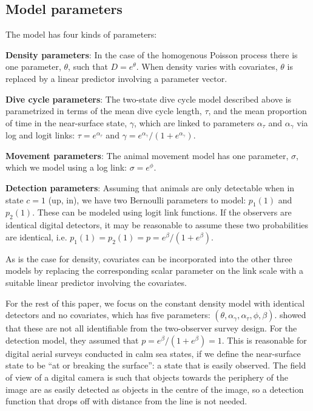 \documentclass[useAMS, usenatbib, referee]{biom}\usepackage[]{graphicx}\usepackage[]{color}
\begin{document}
\subsection{Model parameters}
\label{sec:model_parameters}

The model has four kinds of parameters:

\textbf{Density parameters}: In the case of the homogenous Poisson process there is one parameter, $\theta$, such that $D=e^{\theta}$. When density varies with covariates, $\theta$ is replaced by a linear predictor involving a parameter vector.

\textbf{Dive cycle parameters}: The two-state dive cycle model described above is parametrized in terms of the mean dive cycle length, $\tau$, and the mean proportion of time in the near-surface state, $\gamma$, which are linked to parameters $\alpha_\tau$ and $\alpha_\gamma$ via log and logit links: $\tau=e^{\alpha_\tau}$ and $\gamma=e^{\alpha_\gamma}/(1+e^{\alpha_\gamma})$.

\textbf{Movement parameters}: The animal movement model has one parameter, $\sigma$, which we model using a log link: $\sigma=e^\phi$.

\textbf{Detection parameters}: Assuming that animals are only detectable when in state $c=1$ (up, in), we have two Bernoulli parameters to model: $p_1(1)$ and  $p_2(1)$. These can be modeled using logit link functions. If the observers are identical digital detectors, it may be reasonable to assume these two probabilities are identical, i.e. $p_1(1)=p_2(1)=p=e^\beta/(1+e^\beta)$.

As is the case for density, covariates can be incorporated into the other three models by replacing the corresponding scalar parameter on the link scale with a suitable linear predictor involving the covariates.


For the rest of this paper, we focus on the constant density model with identical detectors and no covariates, which has five parameters: $(\theta,\alpha_\gamma,\alpha_\tau, \phi, \beta)$. \cite{Stevenson+al:18} showed that these are not all identifiable from the two-observer survey design. For the detection model, they assumed that $p=e^\beta/(1+e^\beta)=1$. This is reasonable for digital aerial surveys conducted in calm sea states, if we define the near-surface state to be ``at or breaking the surface'': a state that is easily observed. The field of view of a digital camera is such that objects towards the periphery of the image are as easily detected as objects in the centre of the image, so a detection function that drops off with distance from the line is not needed.
\end{document}
